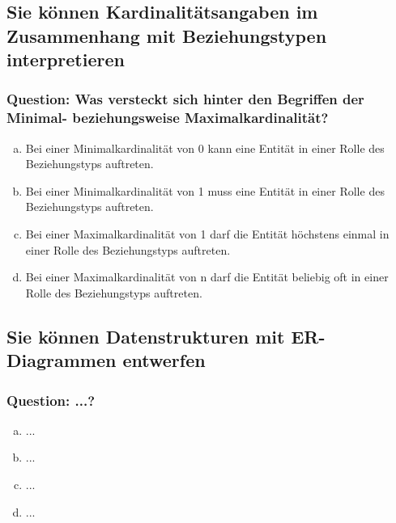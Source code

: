 \documentclass{article}
\begin{document}
\begin{adjustwidth}{2em}{2em}
\begin{adjustwidth}{2em}{2em}
			\subsection{Sie können Kardinalitätsangaben im Zusammenhang mit Beziehungstypen interpretieren}
			\begin{adjustwidth}{1em}{}
				\subsubsection*{Question: Was versteckt sich hinter den Begriffen der Minimal- beziehungsweise Maximalkardinalität?}
				\begin{adjustwidth}{1em}{}
					\begin{enumerate}[(a)]
						\item Bei einer Minimalkardinalität von 0 kann eine Entität in einer Rolle des Beziehungstyps auftreten.
						\item Bei einer Minimalkardinalität von 1 muss eine Entität in einer Rolle des Beziehungstyps auftreten.
						\item Bei einer Maximalkardinalität von 1 darf die Entität höchstens einmal in einer Rolle des Beziehungstyps auftreten.
						\item Bei einer Maximalkardinalität von n darf die Entität beliebig oft in einer Rolle des Beziehungstyps auftreten.
					\end{enumerate}
				\end{adjustwidth}
			\end{adjustwidth}
			\subsection{Sie können Datenstrukturen mit ER-Diagrammen entwerfen}
			\begin{adjustwidth}{1em}{}
				\subsubsection*{Question: ...?}
				\begin{adjustwidth}{1em}{}
					\begin{enumerate}[(a)]
						\item ...
						\item ...
						\item ...
						\item ...
					\end{enumerate}
				\end{adjustwidth}
			\end{adjustwidth}

\end{adjustwidth}
\end{adjustwidth}
\end{document}
